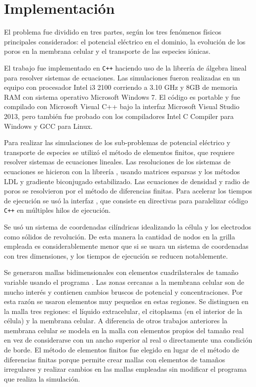 
\section{Implementación}
El problema fue dividido en tres partes, según los tres fenómenos físicos principales considerados: el potencial eléctrico en el dominio, la evolución de los poros en la membrana celular y el transporte de las especies iónicas. 

El trabajo fue implementado en \texttt{C++} haciendo uso de la librería de álgebra lineal  para resolver sistemas de ecuaciones. Las simulaciones fueron realizadas en un equipo con procesador Intel i3 2100 corriendo a 3.10 GHz y 8GB de memoria RAM con sistema operativo Microsoft Windows 7. El código es portable y fue compilado con Microsoft Visual C++ bajo la interfaz Microsoft Visual Studio 2013, pero también fue probado con los compiladores Intel C Compiler para Windows y GCC para Linux.

Para realizar las simulaciones de los sub-problemas de potencial eléctrico y transporte de especies se utilizó el método de elementos finitos, que requiere resolver sistemas de ecuaciones lineales. Las resoluciones de los sistemas de ecuaciones se hicieron con la librería , usando matrices esparsas y los métodos LDL y gradiente biconjugado estabilizado. Las ecuaciones de densidad y radio de poros se resolvieron por el método de diferencias finitas. Para acelerar los tiempos de ejecución se usó la interfaz , que consiste en directivas para paralelizar código \texttt{C++} en múltiples hilos de ejecución. 

Se usó un sistema de coordenadas cilíndricas idealizando la célula y los electrodos como sólidos de revolución. De esta manera la cantidad de nodos en la grilla empleada es considerablemente menor que si se usara un sistema de coordenadas con tres dimensiones, y los tiempos de ejecución se reducen notablemente. 

Se generaron mallas bidimensionales con elementos cuadrilaterales de tamaño variable usando el programa . Las zonas cercanas a la membrana celular son de mucho interés y contienen cambios bruscos de potencial y concentraciones. Por esta razón se usaron elementos muy pequeños en estas regiones. Se distinguen en la malla tres regiones: el líquido extracelular, el citoplasma (en el interior de la célula) y la membrana celular. A diferencia de otros trabajos anteriores la membrana celular se modela en la malla con elementos propios del tamaño real en vez de considerarse con un ancho superior al real o directamente una condición de borde. El método de elementos finitos fue elegido en lugar de el método de diferencias finitas porque permite crear mallas con elementos de tamaños irregulares y realizar cambios en las mallas empleadas sin modificar el programa que realiza la simulación.

